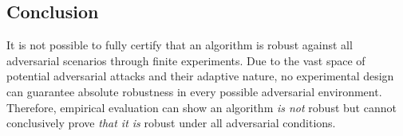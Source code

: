 \subsection*{Conclusion}

\noindent It is not possible to fully certify that an algorithm is robust against all adversarial scenarios through finite experiments. Due to the vast space of potential adversarial attacks and their adaptive nature, no experimental design can guarantee absolute robustness in every possible adversarial environment. Therefore, empirical evaluation can show an algorithm \emph{is not} robust but cannot conclusively prove \emph{that it is} robust under all adversarial conditions.

